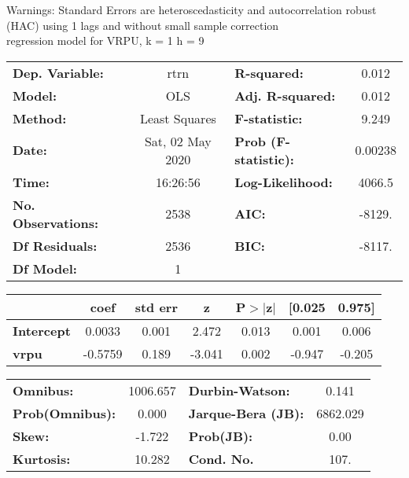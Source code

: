 Warnings: \newline
 [1] Standard Errors are heteroscedasticity and autocorrelation robust (HAC) using 1 lags and without small sample correction\\ 

regression model for VRPU, k = 1 h = 9\begin{center}
\begin{tabular}{lclc}
\toprule
\textbf{Dep. Variable:}    &       rtrn       & \textbf{  R-squared:         } &     0.012   \\
\textbf{Model:}            &       OLS        & \textbf{  Adj. R-squared:    } &     0.012   \\
\textbf{Method:}           &  Least Squares   & \textbf{  F-statistic:       } &     9.249   \\
\textbf{Date:}             & Sat, 02 May 2020 & \textbf{  Prob (F-statistic):} &  0.00238    \\
\textbf{Time:}             &     16:26:56     & \textbf{  Log-Likelihood:    } &    4066.5   \\
\textbf{No. Observations:} &        2538      & \textbf{  AIC:               } &    -8129.   \\
\textbf{Df Residuals:}     &        2536      & \textbf{  BIC:               } &    -8117.   \\
\textbf{Df Model:}         &           1      & \textbf{                     } &             \\
\bottomrule
\end{tabular}
\begin{tabular}{lcccccc}
                   & \textbf{coef} & \textbf{std err} & \textbf{z} & \textbf{P$> |$z$|$} & \textbf{[0.025} & \textbf{0.975]}  \\
\midrule
\textbf{Intercept} &       0.0033  &        0.001     &     2.472  &         0.013        &        0.001    &        0.006     \\
\textbf{vrpu}      &      -0.5759  &        0.189     &    -3.041  &         0.002        &       -0.947    &       -0.205     \\
\bottomrule
\end{tabular}
\begin{tabular}{lclc}
\textbf{Omnibus:}       & 1006.657 & \textbf{  Durbin-Watson:     } &    0.141  \\
\textbf{Prob(Omnibus):} &   0.000  & \textbf{  Jarque-Bera (JB):  } & 6862.029  \\
\textbf{Skew:}          &  -1.722  & \textbf{  Prob(JB):          } &     0.00  \\
\textbf{Kurtosis:}      &  10.282  & \textbf{  Cond. No.          } &     107.  \\
\bottomrule
\end{tabular}
\end{center}


